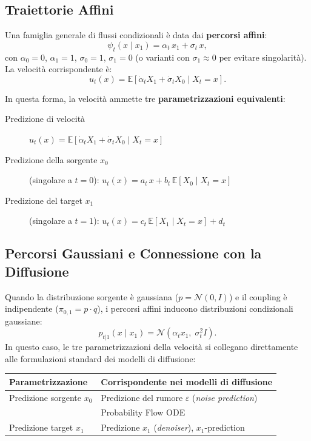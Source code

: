 \subsection{Traiettorie Affini}
\label{subsec:fm-affine}

Una famiglia generale di flussi condizionali è data dai
\textbf{percorsi affini}:
\begin{equation}
  \psi_t(x \mid x_1) = \alpha_t\,x_1 + \sigma_t\,x,
\end{equation}
con $\alpha_0 = 0$, $\alpha_1 = 1$, $\sigma_0 = 1$, $\sigma_1 = 0$
(o varianti con $\sigma_1 \approx 0$ per evitare singolarità).
La velocità corrispondente è:
\begin{equation}
  u_t(x) = \mathbb{E}\!\left[\dot\alpha_t X_1 + \dot\sigma_t X_0 \mid X_t = x\right].
\end{equation}

In questa forma, la velocità ammette tre \textbf{parametrizzazioni
equivalenti}:
\begin{description}
  \item[Predizione di velocità] $u_t(x) = \mathbb{E}[\dot\alpha_t X_1 + \dot\sigma_t X_0 \mid X_t = x]$
  \item[Predizione della sorgente $x_0$] (singolare a $t=0$):
    $u_t(x) = a_t\,x + b_t\,\mathbb{E}[X_0 \mid X_t = x]$
  \item[Predizione del target $x_1$] (singolare a $t=1$):
    $u_t(x) = c_t\,\mathbb{E}[X_1 \mid X_t = x] + d_t$
\end{description}

\subsection{Percorsi Gaussiani e Connessione con la Diffusione}
\label{subsec:fm-gaussian-paths}

Quando la distribuzione sorgente è gaussiana ($p = \mathcal{N}(0, I)$)
e il coupling è indipendente ($\pi_{0,1} = p \cdot q$), i percorsi
affini inducono distribuzioni condizionali gaussiane:
\begin{equation}
  p_{t|1}(x \mid x_1) = \mathcal{N}\!\left(\alpha_t x_1,\; \sigma_t^2 I\right).
\end{equation}
In questo caso, le tre parametrizzazioni della velocità si collegano
direttamente alle formulazioni standard dei modelli di diffusione:

\begin{center}
\begin{tabular}{ll}
  \toprule
  \textbf{Parametrizzazione} & \textbf{Corrispondente nei modelli di diffusione} \\
  \midrule
  Predizione sorgente $x_0$ & Predizione del rumore $\varepsilon$ (\emph{noise prediction}) \\
                             & Probability Flow ODE \\
  Predizione target $x_1$   & Predizione $x_1$ (\emph{denoiser}), $x_1$-prediction \\
  \bottomrule
\end{tabular}
\end{center}

